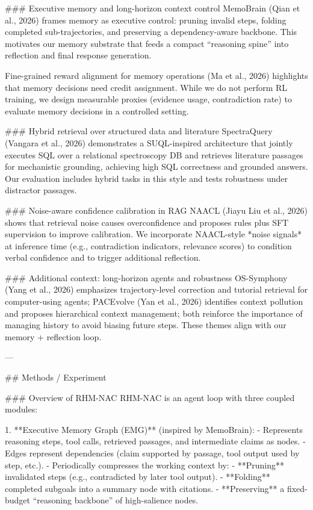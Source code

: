 ### Executive memory and long-horizon context control  
MemoBrain (Qian et al., 2026) frames memory as executive control: pruning invalid steps, folding completed sub-trajectories, and preserving a dependency-aware backbone. This motivates our memory substrate that feeds a compact “reasoning spine” into reflection and final response generation.

Fine-grained reward alignment for memory operations (Ma et al., 2026) highlights that memory decisions need credit assignment. While we do not perform RL training, we design measurable proxies (evidence usage, contradiction rate) to evaluate memory decisions in a controlled setting.

### Hybrid retrieval over structured data and literature  
SpectraQuery (Vangara et al., 2026) demonstrates a SUQL-inspired architecture that jointly executes SQL over a relational spectroscopy DB and retrieves literature passages for mechanistic grounding, achieving high SQL correctness and grounded answers. Our evaluation includes hybrid tasks in this style and tests robustness under distractor passages.

### Noise-aware confidence calibration in RAG  
NAACL (Jiayu Liu et al., 2026) shows that retrieval noise causes overconfidence and proposes rules plus SFT supervision to improve calibration. We incorporate NAACL-style *noise signals* at inference time (e.g., contradiction indicators, relevance scores) to condition verbal confidence and to trigger additional reflection.

### Additional context: long-horizon agents and robustness  
OS-Symphony (Yang et al., 2026) emphasizes trajectory-level correction and tutorial retrieval for computer-using agents; PACEvolve (Yan et al., 2026) identifies context pollution and proposes hierarchical context management; both reinforce the importance of managing history to avoid biasing future steps. These themes align with our memory + reflection loop.

---

## Methods / Experiment  

### Overview of RHM-NAC  
RHM-NAC is an agent loop with three coupled modules:

1. **Executive Memory Graph (EMG)** (inspired by MemoBrain):  
   - Represents reasoning steps, tool calls, retrieved passages, and intermediate claims as nodes.  
   - Edges represent dependencies (claim supported by passage, tool output used by step, etc.).  
   - Periodically compresses the working context by:
     - **Pruning** invalidated steps (e.g., contradicted by later tool output).  
     - **Folding** completed subgoals into a summary node with citations.  
     - **Preserving** a fixed-budget “reasoning backbone” of high-salience nodes.

